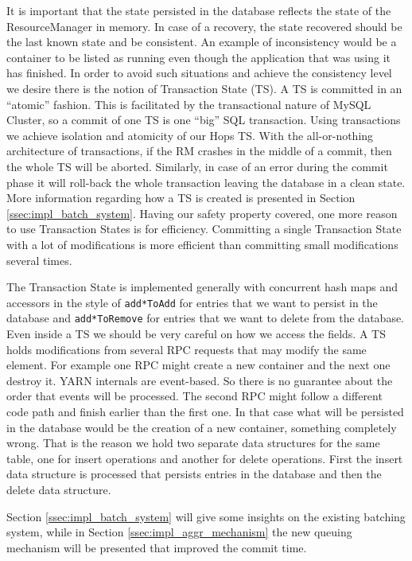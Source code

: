 It is important that the state persisted in the database reflects the
state of the ResourceManager in memory. In case of a recovery, the
state recovered should be the last known state and be consistent. An
example of inconsistency would be a container to be listed as running
even though the application that was using it has finished. In order to
avoid such situations and achieve the consistency level we desire
there is the notion of Transaction State (TS). A TS is committed in an
``atomic'' fashion. This is facilitated by the transactional nature of
MySQL Cluster, so a commit of one TS is one ``big'' SQL
transaction. Using transactions we achieve isolation and atomicity of
our Hops TS. With the all-or-nothing architecture of transactions, if
the RM crashes in the middle of a commit, then the whole TS will be
aborted. Similarly, in case of an error during the commit phase it will
roll-back the whole transaction leaving the database in a clean state.
More information regarding how a TS is created is presented in Section
\ref{ssec:impl_batch_system}. Having our safety property covered, one
more reason to use Transaction States is for efficiency. Committing a
single Transaction State with a lot of modifications is more efficient
than committing small modifications several times.

The Transaction State is implemented generally with concurrent hash maps and
accessors in the style of \texttt{add*ToAdd} for entries that we
want to persist in the database and \texttt{add*ToRemove} for entries
that we want to delete from the database. Even inside a TS we should
be very careful on how we access the fields. A TS holds modifications
from several RPC requests that may modify the same element. For
example one RPC might create a new container and the next one
destroy it. YARN internals are event-based. So there is no guarantee
about the order that events will be processed. The second RPC might
follow a different code path and finish earlier than the first one. In
that case what will be persisted in the database would be the creation
of a new container, something completely wrong. That is the reason
we hold two separate data structures for the same table, one for
insert operations and another for delete operations. First the insert
data structure is processed that persists entries in the database and
then the delete data structure.

Section \ref{ssec:impl_batch_system} will give some insights on
the existing batching system, while in Section
\ref{ssec:impl_aggr_mechanism} the new queuing
mechanism will be presented that improved the commit time.

